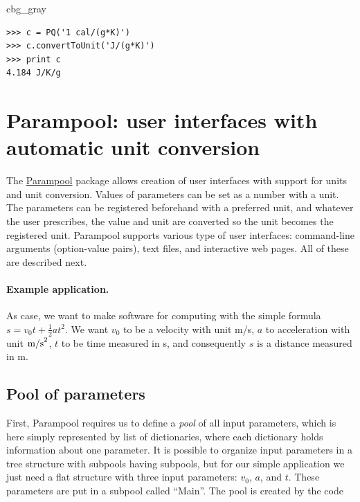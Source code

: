 \documentclass[graybox,envcountchap,sectrefs,final]{svmonodo}
\newenvironment{_cod_tight}[1]{
   \def\FrameCommand{\colorbox{#1}}
   \FrameRule0.6pt\MakeFramed {\FrameRestore}\vskip3mm}
   {\vskip0mm\endMakeFramed}
\newenvironment{cod}[1]{
\bgroup\rmfamily
\fboxsep=0mm\relax
\begin{_cod_tight}{#1}
\list{}{\parsep=-2mm\parskip=0mm\topsep=0pt\leftmargin=2mm
\rightmargin=2\leftmargin\leftmargin=4pt\relax}
\item\relax}
{\endlist\end{_cod_tight}\egroup}
\begin{document}
\begin{cod}{cbg_gray}\begin{Verbatim}[numbers=none,fontsize=\fontsize{9pt}{9pt},baselinestretch=0.95,xleftmargin=2mm]
>>> c = PQ('1 cal/(g*K)')
>>> c.convertToUnit('J/(g*K)')
>>> print c
4.184 J/K/g
\end{Verbatim}
\end{cod}
\noindent

\section{Parampool: user interfaces with automatic unit conversion}
\label{scale:parampool}


The \href{{https://github.com/hplgit/parampool}}{Parampool} package allows
creation of user interfaces with support for units and unit
conversion. Values of parameters can be set as a number with a
unit. The parameters can be registered beforehand with a preferred
unit, and whatever the user prescribes, the value and unit are
converted so the unit becomes the registered unit. Parampool supports
various type of user interfaces: command-line arguments (option-value
pairs), text files, and interactive web pages. All of these
are described next.

\paragraph{Example application.}
As case, we want to make software for computing with the simple
formula $s=v_0t + \frac{1}{2}at^2$. We want $v_0$ to be a velocity
with unit m/s, $a$ to acceleration with unit $\hbox{m/s}^2$, $t$ to be
time measured in s, and consequently $s$ is a distance measured in m.

\subsection{Pool of parameters}

First, Parampool requires us to define a \emph{pool} of all input
parameters, which is here simply represented by list of dictionaries, where each
dictionary holds information about one parameter. It is possible to
organize input parameters in a tree structure with subpools having
subpools,
but for our simple application we just need a flat structure with
three input parameters:
$v_0$, $a$, and $t$. These parameters are put in a subpool called
``Main''. The pool is created by the code
\end{document}
